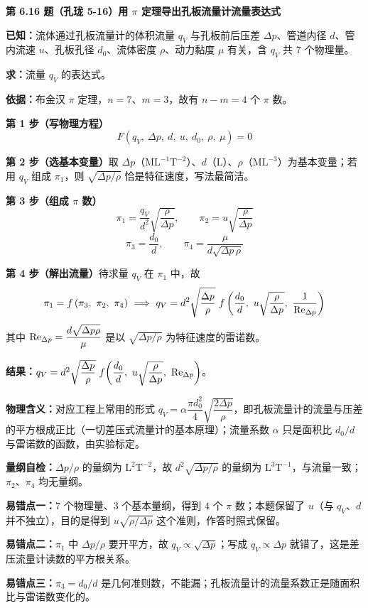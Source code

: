 \noindent\textbf{第 6.16 题（孔珑 5-16）\quad 用 $\pi$ 定理导出孔板流量计流量表达式}

\begin{jie}
\textbf{已知：}流体通过孔板流量计的体积流量 $q_V$ 与孔板前后压差 $\Delta p$、管道内径 $d$、管内流速 $u$、孔板孔径 $d_0$、流体密度 $\rho$、动力黏度 $\mu$ 有关，含 $q_V$ 共 7 个物理量。

\textbf{求：}流量 $q_V$ 的表达式。

\textbf{依据：}布金汉 $\pi$ 定理，$n=7$、$m=3$，故有 $n-m=4$ 个 $\pi$ 数。

\textbf{第 1 步（写物理方程）}\quad
\[F\left(q_V,\ \Delta p,\ d,\ u,\ d_0,\ \rho,\ \mu\right)=0\]

\textbf{第 2 步（选基本变量）}\quad 取 $\Delta p$（$\mathrm{ML^{-1}T^{-2}}$）、$d$（$\mathrm{L}$）、$\rho$（$\mathrm{ML^{-3}}$）为基本变量；若用 $q_V$ 组成 $\pi_1$，则 $\sqrt{\Delta p/\rho}$ 恰是特征速度，写法最简洁。

\textbf{第 3 步（组成 $\pi$ 数）}\quad
\[\pi_1=\frac{q_V}{d^{2}}\sqrt{\frac{\rho}{\Delta p}},\qquad \pi_2=u\sqrt{\frac{\rho}{\Delta p}}\]
\[\pi_3=\frac{d_0}{d},\qquad \pi_4=\frac{\mu}{d\sqrt{\Delta p\,\rho}}\]

\textbf{第 4 步（解出流量）}\quad 待求量 $q_V$ 在 $\pi_1$ 中，故
\[\pi_1=f\left(\pi_3,\ \pi_2,\ \pi_4\right)\ \Longrightarrow\ q_V=d^{2}\sqrt{\frac{\Delta p}{\rho}}\ f\left(\frac{d_0}{d},\ u\sqrt{\frac{\rho}{\Delta p}},\ \frac{1}{\Rey_{\Delta p}}\right)\]
其中 $\mathrm{Re}_{\Delta p}=\dfrac{d\sqrt{\Delta p\rho}}{\mu}$ 是以 $\sqrt{\Delta p/\rho}$ 为特征速度的雷诺数。

\textbf{结果：}$q_V=d^{2}\sqrt{\dfrac{\Delta p}{\rho}}\ f\!\left(\dfrac{d_0}{d},\ u\sqrt{\dfrac{\rho}{\Delta p}},\ \Rey_{\Delta p}\right)$。

\textbf{物理含义：}对应工程上常用的形式 $q_V=\alpha\dfrac{\pi d_0^{2}}{4}\sqrt{\dfrac{2\Delta p}{\rho}}$，即孔板流量计的流量与压差的平方根成正比（一切差压式流量计的基本原理）；流量系数 $\alpha$ 只是面积比 $d_0/d$ 与雷诺数的函数，由实验标定。

\textbf{量纲自检：}$\Delta p/\rho$ 的量纲为 $\mathrm{L^{2}T^{-2}}$，故 $d^{2}\sqrt{\Delta p/\rho}$ 的量纲为 $\mathrm{L^{3}T^{-1}}$，与流量一致；$\pi_2$、$\pi_4$ 均无量纲。
\end{jie}

\begin{yicuo}
\textbf{易错点一：}$7$ 个物理量、$3$ 个基本量纲，得到 $4$ 个 $\pi$ 数；本题保留了 $u$（与 $q_V$、$d$ 并不独立），目的是得到 $u\sqrt{\rho/\Delta p}$ 这个准则，作答时照式保留。

\textbf{易错点二：}$\pi_1$ 中 $\Delta p/\rho$ 要开平方，故 $q_V\propto\sqrt{\Delta p}$；写成 $q_V\propto\Delta p$ 就错了，这是差压流量计读数的平方根关系。

\textbf{易错点三：}$\pi_3=d_0/d$ 是几何准则数，不能漏；孔板流量计的流量系数正是随面积比与雷诺数变化的。
\end{yicuo}

